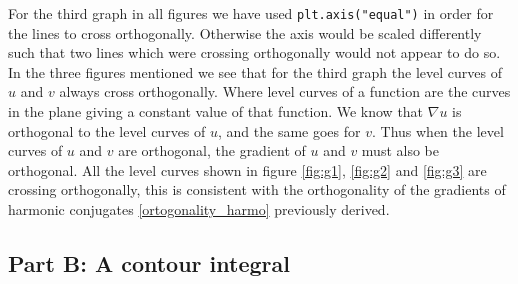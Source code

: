 \documentclass[12pt,twoside]{article}
\begin{document}
For the third graph in all figures we have used \texttt{plt.axis("equal")} in order for the lines to cross orthogonally. Otherwise the axis would be scaled differently such that two lines which were crossing orthogonally would not appear to do so. \\
In the three figures mentioned we see that for the third graph the level curves of $u$ and $v$ always cross orthogonally. Where level curves of a function are the curves in the plane giving a constant value of that function. We know that $\nabla u$ is orthogonal to the level curves of $u$, and the same goes for $v$. Thus when the level curves of $u$ and $v$ are orthogonal, the gradient of $u$ and $v$ must also be orthogonal. All the level curves shown in figure \ref{fig:g1}, \ref{fig:g2} and \ref{fig:g3} are crossing orthogonally, this is consistent with the orthogonality of the gradients of harmonic conjugates \eqref{ortogonality_harmo} previously derived.
\subsection*{Part B: A contour integral}
\end{document}
